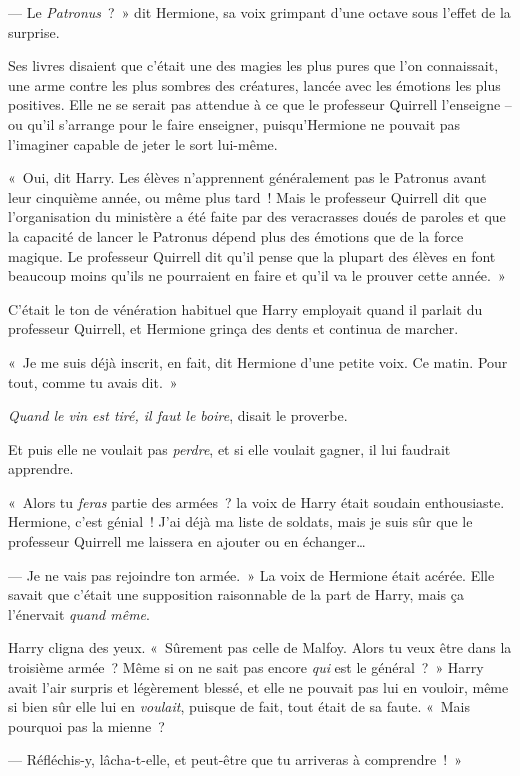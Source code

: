 --- Le \emph{Patronus}~?~» dit Hermione, sa voix grimpant d'une octave sous l'effet de la surprise.

Ses livres disaient que c'était une des magies les plus pures que l'on connaissait, une arme contre les plus sombres des créatures, lancée avec les émotions les plus positives. Elle ne se serait pas attendue à ce que le professeur Quirrell l'enseigne -- ou qu'il s'arrange pour le faire enseigner, puisqu'Hermione ne pouvait pas l'imaginer capable de jeter le sort lui-même.

«~Oui, dit Harry. Les élèves n'apprennent généralement pas le Patronus avant leur cinquième année, ou même plus tard~! Mais le professeur Quirrell dit que l'organisation du ministère a été faite par des veracrasses doués de paroles et que la capacité de lancer le Patronus dépend plus des émotions que de la force magique. Le professeur Quirrell dit qu'il pense que la plupart des élèves en font beaucoup moins qu'ils ne pourraient en faire et qu'il va le prouver cette année.~»

C'était le ton de vénération habituel que Harry employait quand il parlait du professeur Quirrell, et Hermione grinça des dents et continua de marcher.

«~Je me suis déjà inscrit, en fait, dit Hermione d'une petite voix. Ce matin. Pour tout, comme tu avais dit.~»

\emph{Quand le vin est tiré, il faut le boire}, disait le proverbe.

Et puis elle ne voulait pas \emph{perdre}, et si elle voulait gagner, il lui faudrait apprendre.

«~Alors tu \emph{feras} partie des armées~? la voix de Harry était soudain enthousiaste. Hermione, c'est génial~! J'ai déjà ma liste de soldats, mais je suis sûr que le professeur Quirrell me laissera en ajouter ou en échanger…

--- Je ne vais pas rejoindre ton armée.~» La voix de Hermione était acérée. Elle savait que c'était une supposition raisonnable de la part de Harry, mais ça l'énervait \emph{quand même}.

Harry cligna des yeux. «~Sûrement pas celle de Malfoy. Alors tu veux être dans la troisième armée~? Même si on ne sait pas encore \emph{qui} est le général~?~» Harry avait l'air surpris et légèrement blessé, et elle ne pouvait pas lui en vouloir, même si bien sûr elle lui en \emph{voulait}, puisque de fait, tout était de sa faute. «~Mais pourquoi pas la mienne~?

--- Réfléchis-y, lâcha-t-elle, et peut-être que tu arriveras à comprendre~!~»

